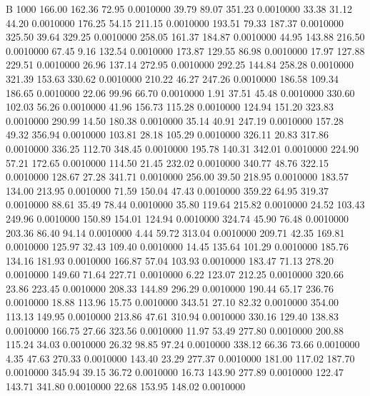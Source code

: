 


B 1000
 166.00  162.36   72.95   0.0010000
  39.79   89.07  351.23   0.0010000
  33.38   31.12   44.20   0.0010000
 176.25   54.15  211.15   0.0010000
 193.51   79.33  187.37   0.0010000
 325.50   39.64  329.25   0.0010000
 258.05  161.37  184.87   0.0010000
  44.95  143.88  216.50   0.0010000
  67.45    9.16  132.54   0.0010000
 173.87  129.55   86.98   0.0010000
  17.97  127.88  229.51   0.0010000
  26.96  137.14  272.95   0.0010000
 292.25  144.84  258.28   0.0010000
 321.39  153.63  330.62   0.0010000
 210.22   46.27  247.26   0.0010000
 186.58  109.34  186.65   0.0010000
  22.06   99.96   66.70   0.0010000
   1.91   37.51   45.48   0.0010000
 330.60  102.03   56.26   0.0010000
  41.96  156.73  115.28   0.0010000
 124.94  151.20  323.83   0.0010000
 290.99   14.50  180.38   0.0010000
  35.14   40.91  247.19   0.0010000
 157.28   49.32  356.94   0.0010000
 103.81   28.18  105.29   0.0010000
 326.11   20.83  317.86   0.0010000
 336.25  112.70  348.45   0.0010000
 195.78  140.31  342.01   0.0010000
 224.90   57.21  172.65   0.0010000
 114.50   21.45  232.02   0.0010000
 340.77   48.76  322.15   0.0010000
 128.67   27.28  341.71   0.0010000
 256.00   39.50  218.95   0.0010000
 183.57  134.00  213.95   0.0010000
  71.59  150.04   47.43   0.0010000
 359.22   64.95  319.37   0.0010000
  88.61   35.49   78.44   0.0010000
  35.80  119.64  215.82   0.0010000
  24.52  103.43  249.96   0.0010000
 150.89  154.01  124.94   0.0010000
 324.74   45.90   76.48   0.0010000
 203.36   86.40   94.14   0.0010000
   4.44   59.72  313.04   0.0010000
 209.71   42.35  169.81   0.0010000
 125.97   32.43  109.40   0.0010000
  14.45  135.64  101.29   0.0010000
 185.76  134.16  181.93   0.0010000
 166.87   57.04  103.93   0.0010000
 183.47   71.13  278.20   0.0010000
 149.60   71.64  227.71   0.0010000
   6.22  123.07  212.25   0.0010000
 320.66   23.86  223.45   0.0010000
 208.33  144.89  296.29   0.0010000
 190.44   65.17  236.76   0.0010000
  18.88  113.96   15.75   0.0010000
 343.51   27.10   82.32   0.0010000
 354.00  113.13  149.95   0.0010000
 213.86   47.61  310.94   0.0010000
 330.16  129.40  138.83   0.0010000
 166.75   27.66  323.56   0.0010000
  11.97   53.49  277.80   0.0010000
 200.88  115.24   34.03   0.0010000
  26.32   98.85   97.24   0.0010000
 338.12   66.36   73.66   0.0010000
   4.35   47.63  270.33   0.0010000
 143.40   23.29  277.37   0.0010000
 181.00  117.02  187.70   0.0010000
 345.94   39.15   36.72   0.0010000
  16.73  143.90  277.89   0.0010000
 122.47  143.71  341.80   0.0010000
  22.68  153.95  148.02   0.0010000
